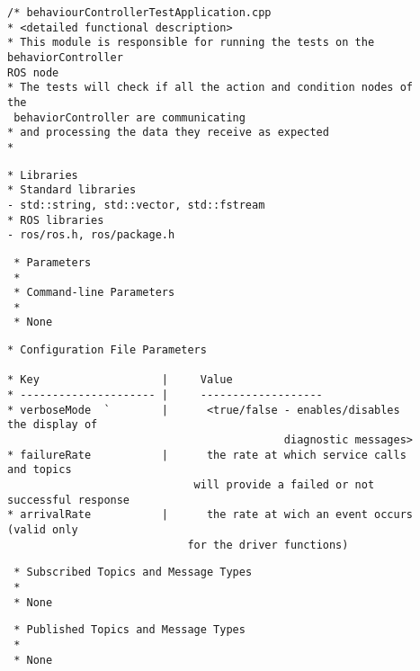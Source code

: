 \documentclass{CSSRforAfrica}
\newcommand{\checkboxChecked}{\fbox{\ding{51}}} %
\begin{document}
\begin{description}

\item[\checkboxChecked] 
 {\small 
\begin{verbatim}
/* behaviourControllerTestApplication.cpp
* <detailed functional description>
* This module is responsible for running the tests on the behaviorController 
ROS node
* The tests will check if all the action and condition nodes of the
 behaviorController are communicating
* and processing the data they receive as expected
*
\end{verbatim}}

\item[\checkboxChecked] 
 {\small 
\begin{verbatim}
* Libraries
* Standard libraries
- std::string, std::vector, std::fstream
* ROS libraries
- ros/ros.h, ros/package.h
\end{verbatim}}

\item[\checkboxChecked] 
 {\small 
\begin{verbatim}
 * Parameters
 *
 * Command-line Parameters
 *
 * None
\end{verbatim}}

\item[\checkboxChecked] 
 {\small 
\begin{verbatim}
* Configuration File Parameters

* Key                   |     Value 
* --------------------- |     -------------------
* verboseMode  `        |      <true/false - enables/disables the display of 
                                           diagnostic messages>
* failureRate           |      the rate at which service calls and topics 
                             will provide a failed or not successful response
* arrivalRate           |      the rate at wich an event occurs (valid only 
                            for the driver functions)

\end{verbatim}}

\item[\checkboxChecked] 
 {\small 
\begin{verbatim}
 * Subscribed Topics and Message Types
 *
 * None
\end{verbatim}}

\item[\checkboxChecked] 
 {\small 
\begin{verbatim}                    
 * Published Topics and Message Types
 *
 * None
\end{verbatim}}


\end{description}
\end{document}
